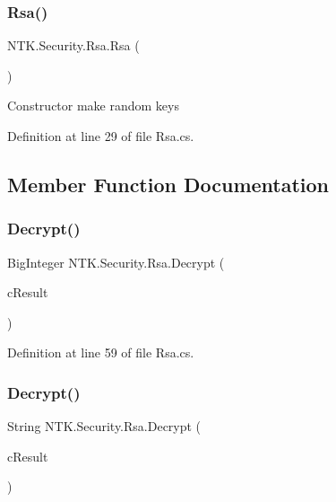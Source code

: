 \subsubsection{\texorpdfstring{Rsa()}{Rsa()}}
{\footnotesize\ttfamily N\+T\+K.\+Security.\+Rsa.\+Rsa (\begin{DoxyParamCaption}{ }\end{DoxyParamCaption})}



Constructor make random keys 



Definition at line 29 of file Rsa.\+cs.



\subsection{Member Function Documentation}
\mbox{\label{class_n_t_k_1_1_security_1_1_rsa_aeb04928fc2be84718eaf7a68f3216d12}} 
\subsubsection{\texorpdfstring{Decrypt()}{Decrypt()}\hspace{0.1cm}{\footnotesize\ttfamily [1/2]}}
{\footnotesize\ttfamily Big\+Integer N\+T\+K.\+Security.\+Rsa.\+Decrypt (\begin{DoxyParamCaption}\item[{Big\+Integer}]{c\+Result }\end{DoxyParamCaption})}



Definition at line 59 of file Rsa.\+cs.

\mbox{\label{class_n_t_k_1_1_security_1_1_rsa_a3de3f74fc427ba58000c798fa7448d09}} 
\subsubsection{\texorpdfstring{Decrypt()}{Decrypt()}\hspace{0.1cm}{\footnotesize\ttfamily [2/2]}}
{\footnotesize\ttfamily String N\+T\+K.\+Security.\+Rsa.\+Decrypt (\begin{DoxyParamCaption}\item[{String}]{c\+Result }\end{DoxyParamCaption})}



